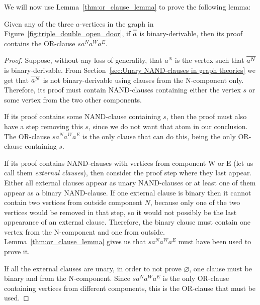 We will now use Lemma~\ref{thm:or_clause_lemma} to prove the following lemma:
\begin{lemma}
  Given any of the three $a$-vertices in the graph in Figure~\ref{fig:triple_double_open_door}, if $\ol{a}$ is binary-derivable, then its proof contains the OR-clause $sa^Na^Wa^E$.
  \label{thm:a_binary_derivable}
\end{lemma}
\begin{proof}
  Suppose, without any loss of generality, that $a^N$ is the vertex such that $\ol{a^N}$ is binary-derivable.
  From Section~\ref{sec:Unary NAND-clauses in graph theories} we get that $\ol{a^N}$ is not binary-derivable using clauses from the N-component only.
  Therefore, its proof must contain NAND-clauses containing either the vertex $s$ or some vertex from the two other components.

  If its proof contains some NAND-clause containing $s$, then the proof must also have a step removing this $s$, since we do not want that atom in our conclusion.
  The OR-clause $sa^Na^Wa^E$ is the only clause that can do this, being the only OR-clause containing $s$.

  If its proof contains NAND-clauses with vertices from component W or E (let us call them \textit{external clauses}), then consider the proof step where they last appear.
  Either all external clauses appear as unary NAND-clauses or at least one of them appear as a binary NAND-clause.
  If one external clause is binary then it cannot contain two vertices from outside component $N$, because only one of the two vertices would be removed in that step, so it would not possibly be the last appearance of an external clause.
  Therefore, the binary clause must contain one vertex from the N-component and one from outside.
  Lemma~\ref{thm:or_clause_lemma} gives us that $sa^Na^Wa^E$ must have been used to prove it.

  If all the external clauses are unary, in order to not prove $\varnothing$, one clause must be binary and from the N-component.
  Since $sa^Na^Wa^E$ is the only OR-clause containing vertices from different components, this is the OR-clause that must be used.
\end{proof}

